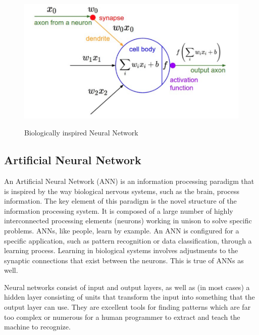 \begin{figure}[H]
\begin{center}
\includegraphics[height=.28\textheight]{Chapter2/Figs/NeuralNetwork.png}
\label{fig:Neural_Network}
\caption{Biologically inspired Neural Network \cite{karparthy}}
\end{center}
\end{figure}

\subsection{Artificial Neural Network}

An Artificial Neural Network (ANN) is an information processing paradigm that is inspired by the way biological nervous systems, such as the brain, process information. The key element of this paradigm is the novel structure of the information processing system. It is composed of a large number of highly interconnected processing elements (neurons) working in unison to solve specific problems. ANNs, like people, learn by example. An ANN is configured for a specific application, such as pattern recognition or data classification, through a learning process. Learning in biological systems involves adjustments to the synaptic connections that exist between the neurons. This is true of ANNs as well.


Neural networks consist of input and output layers, as well as (in most cases) a hidden layer consisting of units that transform the input into something that the output layer can use. They are excellent tools for finding patterns which are far too complex or numerous for a human programmer to extract and teach the machine to recognize.


